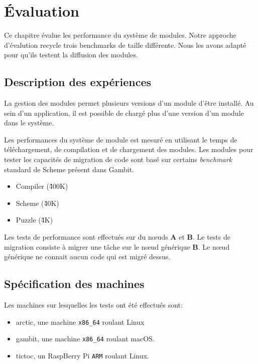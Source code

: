 \chapter{Évaluation}

Ce chapitre évalue les performance du système de modules.
Notre approche d'évalution recycle trois benchmarks
de taille différente. Nous les avons adapté pour qu'ils
testent la diffusion des modules. 


\section{Description des expériences}

La gestion des modules permet plusieurs versions d'un
module d'être installé. Au sein d'un application, il
est possible de chargé plus d'une version d'un module
dans le système.

Les performances du système de module est mesuré en utilisant
le temps de téléchargement, de compilation et de chargement
des modules. Les modules pour tester les capacités de
migration de code sont basé sur certains \textit{benchmark}
standard de Scheme présent dans Gambit.

\begin{itemize}
  \item Compiler (\~400K)
  \item Scheme (\~40K)
  \item Puzzle (\~4K)
\end{itemize}

Les tests de performance sont effectués sur du nœuds \textbf{A}
et \textbf{B}. Le tests de migration consiste à migrer une tâche
sur le nœud générique \textbf{B}. Le nœud générique ne connait aucun
code qui est migré dessus.



\section{Spécification des machines}
Les machines sur lesquelles les tests ont été effectués sont:
\begin{itemize}
  \item arctic, une machine \texttt{x86\_64} roulant Linux
  \item gambit, une machine \texttt{x86\_64} roulant macOS.
  \item tictoc, un RaspBerry Pi \texttt{ARM} roulant Linux.
\end{itemize}

